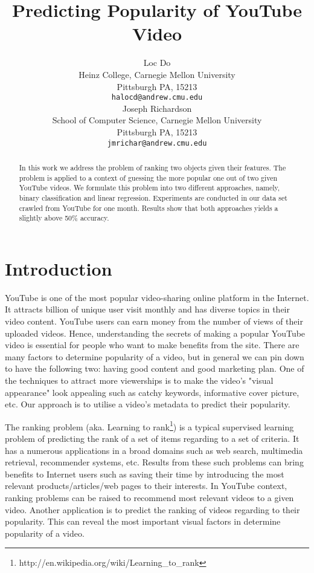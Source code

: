 \documentclass{article} %
\title{Predicting Popularity of YouTube Video}
\author{
Loc Do \\
Heinz College,
Carnegie Mellon University \\
Pittsburgh PA, 15213\\
\texttt{halocd@andrew.cmu.edu} \\
\And
Joseph Richardson \\
School of Computer Science,
Carnegie Mellon University \\
Pittsburgh PA, 15213 \\
\texttt{jmrichar@andrew.cmu.edu} \\
}
\begin{document}
\maketitle

\begin{abstract}
In this work we address the problem of ranking two objects given their features. The problem is applied to a context of guessing the more popular one out of two given YouTube videos. We formulate this problem into two different approaches, namely, binary classification and linear regression. Experiments are conducted in our data set crawled from YouTube for one month. Results show that both approaches yields a slightly above 50\% accuracy.
\end{abstract}

\section{Introduction}
\label{sec:intro}
YouTube is one of the most popular video-sharing online platform in the Internet. It attracts billion of unique user visit monthly and has diverse topics in their video content. YouTube users can earn money from the number of views of their uploaded videos. Hence, understanding the secrets of making a popular YouTube video is essential for people who want to make benefits from the site. There are many factors to determine popularity of a video, but in general we can pin down to have the following two: having good content and good marketing plan. One of the techniques to attract more viewerships is to make the video's "visual appearance" look appealing such as catchy keywords, informative cover picture, etc. Our approach is to utilise a video's metadata to predict their popularity.

The ranking problem (aka. Learning to rank\footnote{http://en.wikipedia.org/wiki/Learning\_to\_rank}) is a typical supervised learning problem of predicting the rank of a set of items regarding to a set of criteria. It has a numerous applications in a broad domains such as web search, multimedia retrieval, recommender systems, etc. Results from these such problems can bring benefits to Internet users such as saving their time by introducing the most relevant products/articles/web pages to their interests. In YouTube context, ranking problems can be raised to recommend most relevant videos to a given video. Another application is to predict the ranking of videos regarding to their popularity. This can reveal the most important visual factors in determine popularity of a video.
\end{document}
